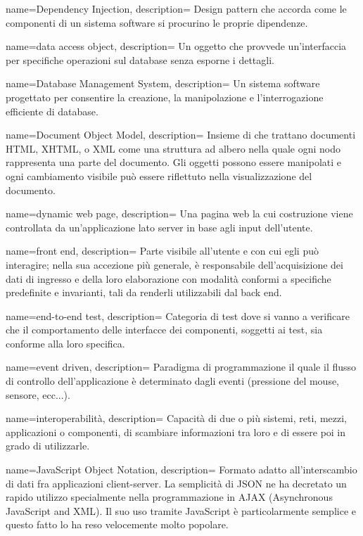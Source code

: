  {
name=Dependency Injection,
description={
Design pattern che accorda come le componenti di un sistema software si
procurino le proprie dipendenze.
}
}

 {
name=data access object,
description={
Un oggetto che provvede un'interfaccia per specifiche operazioni sul database
senza esporne i dettagli.
}
}

 {
name=Database Management System,
description={
Un sistema software progettato per consentire la creazione, la manipolazione
e l'interrogazione efficiente di database.
}
}

 {
name=Document Object Model,
description={
Insieme di  che trattano documenti HTML, XHTML, o XML come una
struttura ad albero nella quale ogni nodo rappresenta una parte del documento.
Gli oggetti possono essere manipolati e ogni cambiamento visibile può essere
riflettuto nella visualizzazione del documento.
}
}

 {
name=dynamic web page,
description={
Una pagina web la cui costruzione viene controllata da un'applicazione lato
server in base agli input dell'utente.
}
}

 {
name=front end,
description={
Parte visibile all’utente e con cui egli può interagire; nella sua accezione più
generale, è responsabile dell’acquisizione dei dati di ingresso e della loro
elaborazione con modalità conformi a specifiche predefinite e invarianti, tali
da renderli utilizzabili dal back end.
}
}

 {
name=end-to-end test,
description={
Categoria di test dove si vanno a verificare che il comportamento delle
interfacce dei componenti, soggetti ai test, sia conforme alla loro specifica.
}
}

 {
name=event driven,
description={
Paradigma di programmazione il quale il flusso di controllo dell'applicazione è
determinato dagli eventi (pressione del mouse, sensore, ecc...).
}
}

 {
name=interoperabilità,
description={
Capacità di due o più sistemi, reti, mezzi, applicazioni o componenti, di
scambiare informazioni tra loro e di essere poi in grado di utilizzarle.
}
}

 {
name=JavaScript Object Notation,
description={
Formato adatto all’interscambio di dati fra applicazioni client-server. La
semplicità di JSON ne ha decretato un rapido utilizzo specialmente nella
programmazione in AJAX (Asynchronous JavaScript and XML). Il suo uso tramite
JavaScript è particolarmente semplice e questo fatto lo ha reso velocemente
molto popolare.
}
}

